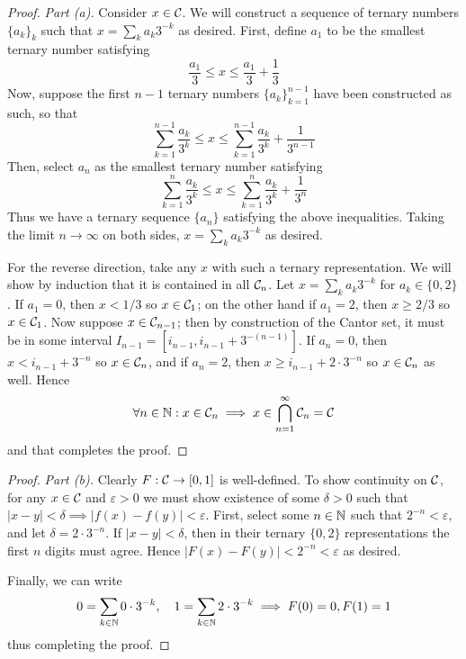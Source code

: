 \begin{proof}
    \emph{Part (a).} Consider \(x \in \mathcal{C}\). We will construct a sequence of ternary numbers \(\{a_k\}_k\) such that \(x = \sum_k a_k 3^{-k}\) as desired. First, define \(a_1\) to be the smallest ternary number satisfying 
    \[
        \frac{a_1}{3} \leq x \leq \frac{a_1}{3} + \frac{1}{3}
    \]
    Now, suppose the first \(n-1\) ternary numbers \(\{a_k\}_{k=1}^{n-1}\) have been constructed as such, so that 
    \[
    \sum_{k=1}^{n-1} \frac{a_k}{3^k} \leq x \leq \sum_{k=1}^{n-1} \frac{a_k}{3^k} + \frac{1}{3^{n-1}}
    \]
    Then, select \(a_n\) as the smallest ternary number satisfying 
    \[
    \sum_{k=1}^{n} \frac{a_k}{3^k} \leq x \leq \sum_{k=1}^n \frac{a_k}{3^k} + \frac{1}{3^n}
    \]
    Thus we have a ternary sequence \(\{a_n\}\) satisfying the above inequalities. Taking the limit \(n \to \infty\) on both sides, \(x = \sum_k a_k 3^{-k}\) as desired. 
    \stdvspace

    For the reverse direction, take any \(x\) with such a ternary representation. We will show by induction that it is contained in all \(\mathcal{C}_n\). Let \(x = \sum_k a_k 3^{-k}\) for \(a_k\in \{0, 2\}\). If \(a_1 = 0\), then \(x < 1/3\) so \(x \in \mathcal{C}_1\); on the other hand if \(a_1 = 2\), then \(x \geq 2/3\) so \(x \in \mathcal{C}_1\). Now suppose \(x \in \mathcal{C}_{n-1}\); then by construction of the Cantor set, it must be in some interval \(I_{n-1} = [i_{n-1}, i_{n-1} + 3^{-(n-1)}]\). If \(a_n = 0\), then \(x < i_{n-1} + 3^{-n}\) so \(x \in \mathcal{C}_n\), and if \(a_n = 2\), then \(x \geq i_{n-1} + 2 \cdot 3^{-n}\) so \(x \in \mathcal{C}_n\) as well. Hence
    \[
    \forall n \in \mathbb{N} : x \in \mathcal{C}_n \implies x \in \bigcap_{n=1}^\infty \mathcal{C}_n = \mathcal{C}
    \]
    and that completes the proof. 
\end{proof}

\begin{proof}
    \emph{Part (b).} Clearly \(F : \mathcal{C} \to [0, 1]\) is well-defined. To show continuity on \(\mathcal{C}\), for any \(x \in \mathcal{C}\) and \(\varepsilon > 0\) we must show existence of some \(\delta > 0\) such that \(|x - y| < \delta \implies |f(x) - f(y)| < \varepsilon\). First, select some \(n \in \mathbb{N}\) such that \(2^{-n} < \varepsilon\), and let \(\delta = 2 \cdot 3^{-n}\). If \(|x - y| < \delta\), then in their ternary \(\{0, 2\}\) representations the first \(n\) digits must agree. Hence \(|F(x) - F(y)| < 2^{-n} < \varepsilon\) as desired. 
    \stdvspace

    Finally, we can write 
    \[
    0 = \sum_{k \in \mathbb{N}} 0 \cdot 3^{-k}, \quad 1 = \sum_{k \in \mathbb{N}} 2 \cdot 3^{-k}
    \implies F(0) = 0, F(1) = 1
    \]
    thus completing the proof. 
\end{proof}


